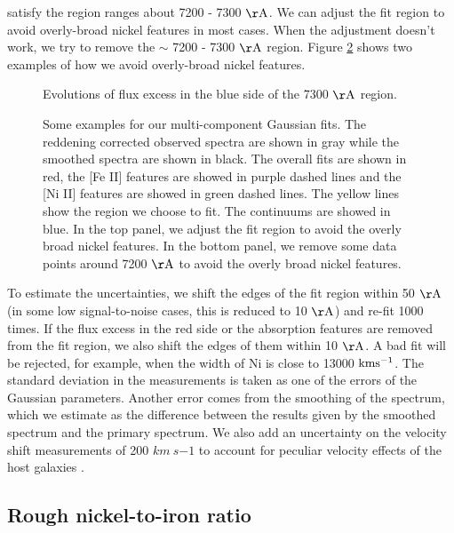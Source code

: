 \documentclass[twocolumn]{aastex631}
\begin{document}
satisfy the region ranges about 7200 - 7300 $\rm \AA$. We can adjust the fit region to avoid overly-broad nickel features in most cases. When the adjustment doesn't work, we try to remove the $\sim$ 7200 - 7300 $\rm \AA$ region. Figure \ref{fig:fit_example0} shows two examples of how we avoid overly-broad nickel features.      

\begin{figure}
\caption{Evolutions of flux excess in the blue side of the 7300 $\rm \AA$ region. }
\label{fig:excess}
\end{figure}

\begin{figure*}[ht!]
\caption{Some examples for our multi-component Gaussian fits. The reddening corrected observed spectra are shown in gray while the smoothed spectra are shown in black. The overall fits are shown in red, the [Fe II] features are showed in purple dashed lines and the [Ni II] features are showed in green dashed lines. The yellow lines show the region we choose to fit. The continuums are showed in blue. In the top panel, we adjust the fit region to avoid the overly broad nickel features. In the bottom panel, we remove some data points around 7200 $\rm \AA$ to avoid the overly broad nickel features.}
\label{fig:fit_example0}
\end{figure*}

To estimate the uncertainties, we shift the edges of the fit region within 50 $\rm \AA$ (in some low signal-to-noise cases, this is reduced to 10 $\rm \AA$) and re-fit 1000 times. If the flux excess in the red side or the absorption features are removed from the fit region, we also shift the edges of them within 10 $\rm \AA$. A bad fit will be rejected, for example, when the width of Ni is close to 13000 $\rm km s^{-1}$. The standard deviation in the measurements is taken as one of the errors of the Gaussian parameters. Another error comes from the smoothing of the spectrum, which we estimate as the difference between the results given by the smoothed spectrum and the primary spectrum. We also add an uncertainty on the velocity shift measurements of 200 $km\ s{-1}$ to account for peculiar velocity effects of the host galaxies \citep{2018MNRAS.477.3567M}.

\subsection{Rough nickel-to-iron ratio \label{subsec:ni-to-fe}}
\end{document}
